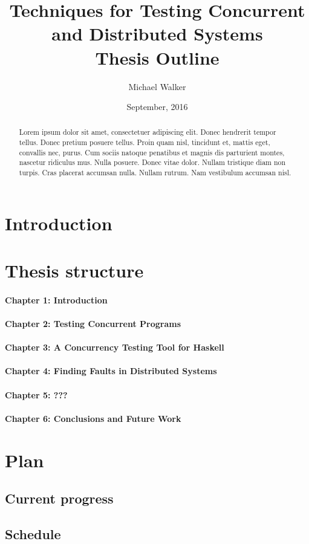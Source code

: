 \documentclass{article}
\title{Techniques for Testing Concurrent and Distributed Systems \\ \large Thesis Outline}
\author{Michael Walker}
\date{September, 2016}
\begin{document}
\maketitle

\begin{abstract}
  Lorem ipsum dolor sit amet, consectetuer adipiscing elit. Donec
  hendrerit tempor tellus. Donec pretium posuere tellus. Proin quam
  nisl, tincidunt et, mattis eget, convallis nec, purus. Cum sociis
  natoque penatibus et magnis dis parturient montes, nascetur
  ridiculus mus. Nulla posuere. Donec vitae dolor. Nullam tristique
  diam non turpis. Cras placerat accumsan nulla. Nullam rutrum. Nam
  vestibulum accumsan nisl.
\end{abstract}

\tableofcontents

\pagebreak

\section{Introduction}

\section{Thesis structure}

\paragraph{Chapter 1: Introduction}

\paragraph{Chapter 2: Testing Concurrent Programs}

\paragraph{Chapter 3: A Concurrency Testing Tool for Haskell}

\paragraph{Chapter 4: Finding Faults in Distributed Systems}

\paragraph{Chapter 5: ???}

\paragraph{Chapter 6: Conclusions and Future Work}

\section{Plan}

\subsection{Current progress}

\subsection{Schedule}


\end{document}
